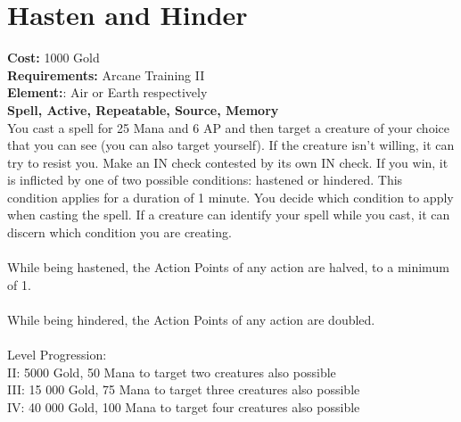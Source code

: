 \section*{Hasten and Hinder}
\textbf{Cost:} 1000 Gold\\
\textbf{Requirements:} Arcane Training II\\
\textbf{Element:}: Air or Earth respectively\\
\textbf{Spell, Active, Repeatable, Source, Memory}\\
You cast a spell for 25 Mana and 6 AP and then target a creature of your choice that you can see (you can also target yourself). If the creature isn’t willing, it can try to resist you. Make an IN check contested by its own IN check. If you win, it is inflicted by one of two possible conditions: hastened or hindered. This condition applies for a duration of 1 minute. You decide which condition to apply when casting the spell. If a creature can identify your spell while you cast, it can discern which condition you are creating.\\
\\
While being hastened, the Action Points of any action are halved, to a minimum of 1.\\
\\
While being hindered, the Action Points of any action are doubled.\\
\\
Level Progression:\\
II: 5000 Gold, 50 Mana to target two creatures also possible\\
III: 15 000 Gold, 75 Mana to target three creatures also possible\\
IV: 40 000 Gold, 100 Mana to target four creatures also possible \\